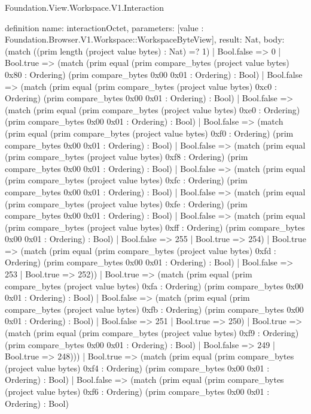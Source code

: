 \begin{lexlean}{Foundation.View.Workspace.V1.Interaction}
\begin{semanticmodule}
definition{
  name: interactionOctet,
  parameters: [value : Foundation.Browser.V1.Workspace::WorkspaceByteView],
  result: Nat,
  body: (match ((prim length (project value bytes) : Nat) =? 1)
    | Bool.false => 0
    | Bool.true => (match (prim equal (prim compare_bytes (project value bytes) 0x80 : Ordering) (prim compare_bytes 0x00 0x01 : Ordering) : Bool)
      | Bool.false => (match (prim equal (prim compare_bytes (project value bytes) 0xc0 : Ordering) (prim compare_bytes 0x00 0x01 : Ordering) : Bool)
        | Bool.false => (match (prim equal (prim compare_bytes (project value bytes) 0xe0 : Ordering) (prim compare_bytes 0x00 0x01 : Ordering) : Bool)
          | Bool.false => (match (prim equal (prim compare_bytes (project value bytes) 0xf0 : Ordering) (prim compare_bytes 0x00 0x01 : Ordering) : Bool)
            | Bool.false => (match (prim equal (prim compare_bytes (project value bytes) 0xf8 : Ordering) (prim compare_bytes 0x00 0x01 : Ordering) : Bool)
              | Bool.false => (match (prim equal (prim compare_bytes (project value bytes) 0xfc : Ordering) (prim compare_bytes 0x00 0x01 : Ordering) : Bool)
                | Bool.false => (match (prim equal (prim compare_bytes (project value bytes) 0xfe : Ordering) (prim compare_bytes 0x00 0x01 : Ordering) : Bool)
                  | Bool.false => (match (prim equal (prim compare_bytes (project value bytes) 0xff : Ordering) (prim compare_bytes 0x00 0x01 : Ordering) : Bool)
                    | Bool.false => 255
                    | Bool.true => 254)
                  | Bool.true => (match (prim equal (prim compare_bytes (project value bytes) 0xfd : Ordering) (prim compare_bytes 0x00 0x01 : Ordering) : Bool)
                    | Bool.false => 253
                    | Bool.true => 252))
                | Bool.true => (match (prim equal (prim compare_bytes (project value bytes) 0xfa : Ordering) (prim compare_bytes 0x00 0x01 : Ordering) : Bool)
                  | Bool.false => (match (prim equal (prim compare_bytes (project value bytes) 0xfb : Ordering) (prim compare_bytes 0x00 0x01 : Ordering) : Bool)
                    | Bool.false => 251
                    | Bool.true => 250)
                  | Bool.true => (match (prim equal (prim compare_bytes (project value bytes) 0xf9 : Ordering) (prim compare_bytes 0x00 0x01 : Ordering) : Bool)
                    | Bool.false => 249
                    | Bool.true => 248)))
              | Bool.true => (match (prim equal (prim compare_bytes (project value bytes) 0xf4 : Ordering) (prim compare_bytes 0x00 0x01 : Ordering) : Bool)
                | Bool.false => (match (prim equal (prim compare_bytes (project value bytes) 0xf6 : Ordering) (prim compare_bytes 0x00 0x01 : Ordering) : Bool)
}
\end{semanticmodule}
\end{lexlean}
